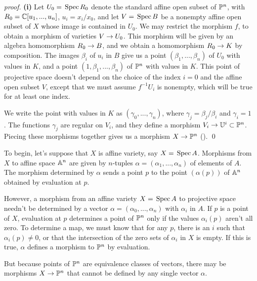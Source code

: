 \documentclass[leqno]{book}
\theoremstyle{definition}%
\numberwithin{equation}{section}
\theoremstyle{theorem} %
\renewenvironment{proof}{\no \emph{proof.}}{}
\begin{document}
\begin{proof} {\bf (i)} Let $U_0= \,\operatorname{Spec} R_0$
denote the standard affine open subset of $\mathbb{P}^n$, with $R_0 =
\mathbb{C}[u_1,...,u_n]$, $u_i = x_i/x_0$, and let $V = \,\operatorname{Spec} B$ be a
nonempty affine open subset of $X$ whose image is contained in $U_0$.
We may restrict the morphism $f$, to obtain a morphism of varieties $V
\rightarrow U_0$.  This morphism will be given by an algebra homomorphism $R_0
\rightarrow B$, and we obtain a homomorphism $R_0 \rightarrow K$ by composition.  The
images $\beta_i$ of $u_i$ in $B$ give us a point
$(\beta_1,...,\beta_n)$ of $U_0$ with values in $K$, and a point
$(1,\beta_1,...,\beta_n)$ of $\mathbb{P}^n$ with values in $K$.  This point
of projective space doesn't depend on the choice of the index $i=0$
and the affine open subset $V$, except that we must assume $f^{-1}U_i$
is nonempty, which will be true for at least one index.

\msno {} We write the point with values in $K$ as
$(\gamma_0,...,\gamma_n)$, where $\gamma_j = \beta_j/\beta_i$ and
$\gamma_i=1$.  The functions $\gamma_j$ are regular on $V_i$, and they
define a morphism $V_i \rightarrow \mathbb{U}^i \subset \mathbb{P}^n$.  Piecing these
morphisms together gives us a morphism $X\rightarrow \mathbb{P}^n$
().  \qed\end{proof}



\msno To begin, let's suppose that $X$ is affine variety, say $X =
\,\operatorname{Spec} A$.  Morphisms from $X$ to affine space $\mathbb{A}^n$ are given by
$n$-tuples $\alpha = (\alpha_1,...,\alpha_n)$ of elements of $A$.
The morphism determined by $\alpha$ sends a point $p$ to the point
$(\alpha(p))$ of $\mathbb{A}^n$ obtained by evaluation at $p$.

However, a morphism from an affine variety $X = \,\operatorname{Spec} A$ to
projective space needn't be determined by a vector
$\alpha = (\alpha_0,...,\alpha_n)$ with $\alpha_i$ in $A$.
 If $p$ is a point of $X$, evaluation at $p$ determines a
point of $\mathbb{P}^n$ only if the values $\alpha_i(p)$ aren't all zero.
To determine a map, we must know that for any $p$, there is an $i$
such that $\alpha_i(p) \neq 0$, or that the intersection of the zero
sets of $\alpha_i$ in $X$ is empty.  If this is true, $\alpha$
defines a morphism to $\mathbb{P}^n$ by evaluation.

\ms But because points of $\mathbb{P}^n$ are
equivalence classes of vectors, there may be
morphisms $X \rightarrow \mathbb{P}^n$ that cannot be defined by any single vector
$\alpha$.
\end{document}
